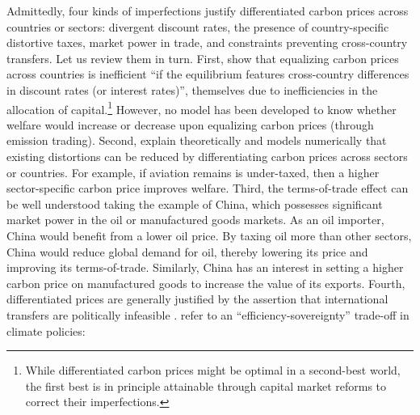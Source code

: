 \documentclass[12pt,english]{article}
\begin{document}
Admittedly, four kinds of imperfections justify differentiated carbon prices across countries or sectors: divergent discount rates, the presence of country-specific distortive taxes, market power in trade, and constraints preventing cross-country transfers. Let us review them in turn. First, \cite{anthoff_differentiated_2021} show that equalizing carbon prices across countries is inefficient ``if the equilibrium features cross-country differences in discount rates (or interest rates)'', themselves due to inefficiencies in the allocation of capital.\footnote{While differentiated carbon prices might be optimal in a second-best world, the first best is in principle attainable through capital market reforms to correct their imperfections.} However, %
no model has been developed to know 
whether welfare would increase or decrease upon equalizing carbon prices (through emission trading). %
Second, \cite{babiker_is_2004} explain theoretically and \cite{boeters_optimally_2014} models numerically that existing distortions can be reduced by differentiating carbon prices across sectors or countries. For example, if %
aviation remains is %
under-taxed, then a higher sector-specific carbon price %
improves welfare.
Third, the terms-of-trade effect can be well understood taking the example of China, which possesses significant %
market power in the oil or manufactured goods markets. As an oil importer, China would benefit from a lower oil price. By taxing oil more than other sectors, China would reduce global %
demand for oil, thereby lowering its price and improving its terms-of-trade. Similarly, China has an interest in setting a higher carbon price on manufactured goods to increase the value of its exports. 
Fourth, differentiated prices are generally justified by the assertion that international transfers are politically infeasible \citep{parry_proposal_2021,young-brun_within-country_2025}. \cite{bauer_quantification_2020} refer to an ``efficiency-sovereignty'' trade-off in climate policies: %
\end{document}
